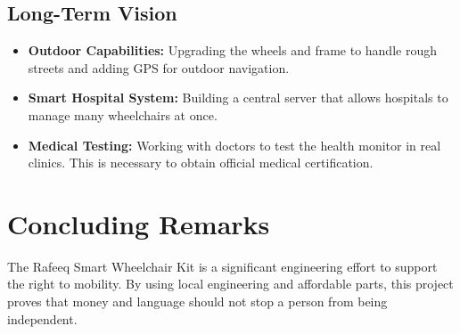 \documentclass[12pt,a4paper]{report}
\begin{document}
\subsection{Long-Term Vision}
\begin{itemize}
    \item \textbf{Outdoor Capabilities:} Upgrading the wheels and frame to handle rough streets and adding GPS for outdoor navigation.
    \item \textbf{Smart Hospital System:} Building a central server that allows hospitals to manage many wheelchairs at once.
    \item \textbf{Medical Testing:} Working with doctors to test the health monitor in real clinics. This is necessary to obtain official medical certification.
\end{itemize}

\section{Concluding Remarks}

The Rafeeq Smart Wheelchair Kit is a significant engineering effort to support the right to mobility. By using local engineering and affordable parts, this project proves that money and language should not stop a person from being independent.
\end{document}
